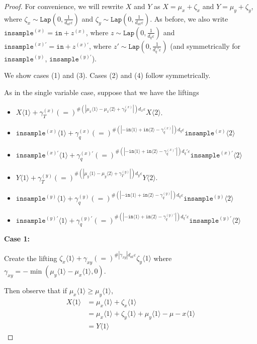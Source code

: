 \documentclass[12pt]{article}
\newcommand{\brangle}[1]{\langle#1 \rangle}
\newcommand{\Lap}{\texttt{Lap}}
\theoremstyle{definition}
\begin{document}
\begin{proof}
    For convenience, we will rewrite $X$ and $Y$ as $X = \mu_x + \zeta_x$ and $Y = \mu_y + \zeta_y$, where $\zeta_x \sim\Lap(0, \frac{1}{d_{at}\varepsilon})$ and $\zeta_y \sim\Lap(0, \frac{1}{d_{at}\varepsilon})$. 
    As before, we also write $\texttt{insample}^{(x)} = \texttt{in} + z^{(x)}$, where $z\sim\Lap(0, \frac{1}{d_q\varepsilon})$ and $\texttt{insample}^{(x)\prime} = \texttt{in} + z^{(x)\prime}$, where $z'\sim\Lap(0, \frac{1}{d_q'\varepsilon})$ (and symmetrically for $\texttt{insample}^{(y)}$, $\texttt{insample}^{(y)\prime}$).

    We show cases (1) and (3). Cases (2) and (4) follow symmetrically. 

    As in the single variable case, suppose that we have the liftings
    \begin{itemize}
        \item $X\brangle{1}+\gamma_T^{(x)} (=)^{\#(|\mu_x\brangle{1}-\mu_x\brangle{2}+\gamma_T^{(x)}|)d_x\varepsilon}X\brangle{2}$.
        \item $\texttt{insample}^{(x)}\brangle{1} +\gamma_q^{(x)}{(=)}^{\#(|-\texttt{in}\brangle{1}+\texttt{in}\brangle{2}-\gamma_q^{(x)}|)d_q\varepsilon}\texttt{insample}^{(x)}\brangle{2}$
        \item $\texttt{insample}^{(x)\prime}\brangle{1} +\gamma_q^{(x)\prime}{(=)}^{\#(|-\texttt{in}\brangle{1}+\texttt{in}\brangle{2}-\gamma_q^{(x)\prime}|)d_q'\varepsilon}\texttt{insample}^{(x)\prime}\brangle{2}$
        \item $Y\brangle{1}+\gamma_T^{(y)} (=)^{\#(|\mu_y\brangle{1}-\mu_y\brangle{2}+\gamma_T^{(y)}|)d_y\varepsilon}Y\brangle{2}$.
        \item $\texttt{insample}^{(y)}\brangle{1} +\gamma_q^{(y)}{(=)}^{\#(|-\texttt{in}\brangle{1}+\texttt{in}\brangle{2}-\gamma_q^{(y)}|)d_q\varepsilon}\texttt{insample}^{(y)}\brangle{2}$
        \item $\texttt{insample}^{(y)\prime}\brangle{1} +\gamma_q^{(y)\prime}{(=)}^{\#(|-\texttt{in}\brangle{1}+\texttt{in}\brangle{2}-\gamma_q^{(y)\prime}|)d_q'\varepsilon}\texttt{insample}^{(y)\prime}\brangle{2}$
    \end{itemize}

    \textbf{Case 1:}

    Create the lifting $\zeta_x\brangle{1} +\gamma_{xy}(=)^{\#|\gamma_{xy}|d_{at}\varepsilon}\zeta_y\brangle{1}$ where $\gamma_{xy} = -\min(\mu_y\brangle{1}-\mu_x\brangle{1}, 0)$. 

    Then observe that if $\mu_x\brangle{1}\geq \mu_y\brangle{1}$, \begin{align*}
        X\brangle{1}&= \mu_x\brangle{1} + \zeta_x\brangle{1}\\
        &= \mu_x\brangle{1} + \zeta_y\brangle{1}+\mu_y\brangle{1}-\mu-x\brangle{1}\\
        &=Y\brangle{1}
    \end{align*}


\end{proof}
\end{document}
